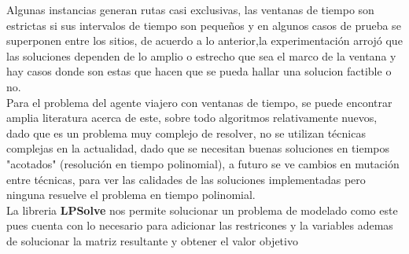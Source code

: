 \documentclass[journal, a4paper]{IEEEtran}
\begin{document}
Algunas instancias generan rutas casi exclusivas, las ventanas de tiempo son estrictas
si sus intervalos de tiempo son peque\~nos y en algunos casos de prueba se superponen entre
los sitios, de acuerdo a lo anterior,la experimentaci\'on arroj\'o que las soluciones
dependen de lo amplio o estrecho que sea el marco de la ventana y hay casos donde
son estas que hacen que se pueda hallar una solucion factible o no.\\ 

Para el problema del agente viajero con ventanas de tiempo, se puede encontrar amplia literatura acerca de este,
sobre todo algoritmos relativamente nuevos, dado que es un problema muy complejo de
resolver, no se utilizan t\'ecnicas complejas en la actualidad, dado que se necesitan buenas
soluciones en tiempos "acotados" (resoluci\'on en tiempo polinomial), a futuro se ve cambios
en mutaci\'on entre t\'ecnicas, para ver las calidades de las soluciones implementadas
pero ninguna resuelve el problema en tiempo polinomial.\cite{TSPTWCOMPLEX}
\\ 
La libreria \textbf{LPSolve} nos permite solucionar un problema de modelado
como este pues cuenta con lo necesario para adicionar las restricones y la variables
ademas de solucionar la matriz resultante y obtener el valor objetivo 
\end{document}
